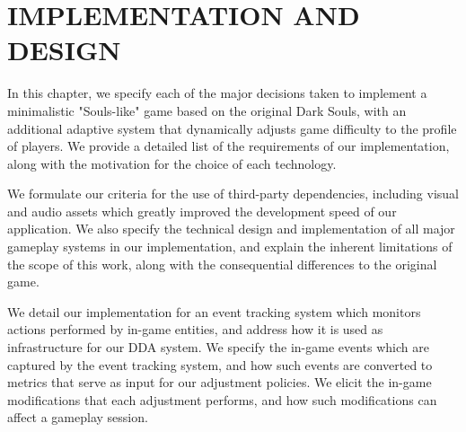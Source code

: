 \chapter{IMPLEMENTATION AND DESIGN}
\label{ch:implementation-design}




In this chapter, we specify each of the major decisions taken to implement a minimalistic "Souls-like" game based on the original Dark Souls, with an additional adaptive system that dynamically adjusts game difficulty to the profile of players. We provide a detailed list of the requirements of our implementation, along with the motivation for the choice of each technology.

We formulate our criteria for the use of third-party dependencies, including visual and audio assets which greatly improved the development speed of our application. We also specify the technical design and implementation of all major gameplay systems in our implementation, and explain the inherent limitations of the scope of this work, along with the consequential differences to the original game. 

We detail our implementation for an event tracking system which monitors actions performed by in-game entities, and address how it is used as infrastructure for our DDA system. We specify the in-game events which are captured by the event tracking system, and how such events are converted to metrics that serve as input for our adjustment policies. We elicit the in-game modifications that each adjustment performs, and how such modifications can affect a gameplay session. 



